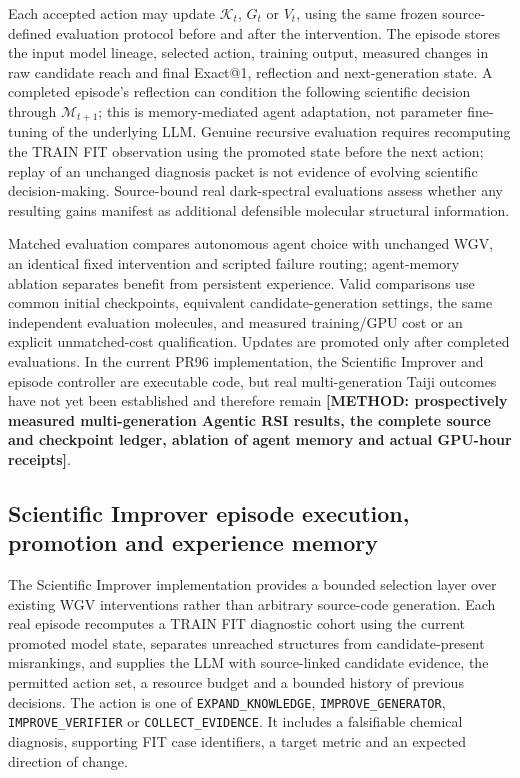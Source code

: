 \documentclass[11pt]{article}
\newcommand{\methodtodo}[1]{\textbf{\textcolor{orbitviolet}{[METHOD: #1]}}}
\begin{document}
Each accepted action may update \(\mathcal K_t\), \(G_t\) or \(V_t\), using the same frozen source-defined evaluation protocol before and after the intervention. The episode stores the input model lineage, selected action, training output, measured changes in raw candidate reach and final Exact@1, reflection and next-generation state. A completed episode's reflection can condition the following scientific decision through \(\mathcal M_{t+1}\); this is memory-mediated agent adaptation, not parameter fine-tuning of the underlying LLM. Genuine recursive evaluation requires recomputing the TRAIN FIT observation using the promoted state before the next action; replay of an unchanged diagnosis packet is not evidence of evolving scientific decision-making. Source-bound real dark-spectral evaluations assess whether any resulting gains manifest as additional defensible molecular structural information.

Matched evaluation compares autonomous agent choice with unchanged WGV, an identical fixed intervention and scripted failure routing; agent-memory ablation separates benefit from persistent experience. Valid comparisons use common initial checkpoints, equivalent candidate-generation settings, the same independent evaluation molecules, and measured training/GPU cost or an explicit unmatched-cost qualification. Updates are promoted only after completed evaluations. In the current PR96 implementation, the Scientific Improver and episode controller are executable code, but real multi-generation Taiji outcomes have not yet been established and therefore remain \methodtodo{prospectively measured multi-generation Agentic RSI results, the complete source and checkpoint ledger, ablation of agent memory and actual GPU-hour receipts}.

\subsection*{Scientific Improver episode execution, promotion and experience memory}
The Scientific Improver implementation provides a bounded selection layer over existing WGV interventions rather than arbitrary source-code generation. Each real episode recomputes a TRAIN FIT diagnostic cohort using the current promoted model state, separates unreached structures from candidate-present misrankings, and supplies the LLM with source-linked candidate evidence, the permitted action set, a resource budget and a bounded history of previous decisions. The action is one of \texttt{EXPAND\_KNOWLEDGE}, \texttt{IMPROVE\_GENERATOR}, \texttt{IMPROVE\_VERIFIER} or \texttt{COLLECT\_EVIDENCE}. It includes a falsifiable chemical diagnosis, supporting FIT case identifiers, a target metric and an expected direction of change.
\end{document}
